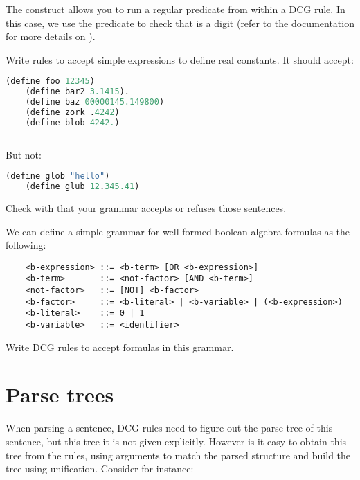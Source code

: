 \documentclass{../../../tp}
\begin{document}
The  construct allows you to run a regular \prolog predicate from within a DCG rule. In this case, we use the  predicate to check that  is a digit (refer to the documentation for more details on ).

\begin{instruction}
	Write rules to accept simple \scheme expressions to define real constants. It should accept:
	
	\begin{lstlisting}[language=lisp]
	(define foo 12345)
	(define bar2 3.1415).
	(define baz 00000145.149800)
	(define zork .4242)
	(define blob 4242.)
	
	\end{lstlisting}
	
	But not: 
	
	\begin{lstlisting}[language=lisp]
	(define glob "hello")
	(define glub 12.345.41)
	\end{lstlisting}
	
	Check with  that your grammar accepts or refuses those sentences.
\end{instruction}  




\begin{instruction}
	We can define a simple grammar for well-formed boolean algebra formulas as the following:
	
	\begin{verbatim}
	<b-expression> ::= <b-term> [OR <b-expression>]
	<b-term>       ::= <not-factor> [AND <b-term>]
	<not-factor>   ::= [NOT] <b-factor>
	<b-factor>     ::= <b-literal> | <b-variable> | (<b-expression>)
	<b-literal>    ::= 0 | 1
	<b-variable>   ::= <identifier>
	\end{verbatim}
	
	Write DCG rules to accept formulas in this grammar. 
\end{instruction}


\section{Parse trees}

When parsing a sentence, DCG rules need to figure out the parse tree of this sentence, but this tree it is not given explicitly. However is it easy to obtain this tree from the rules, using arguments to match the parsed structure and build the tree using unification. Consider for instance:
\end{document}
